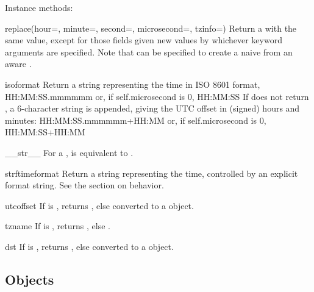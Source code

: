 Instance methods:

\begin{methoddesc}{replace}(hour=, minute=, second=, microsecond=, tzinfo=)
  Return a  with the same value, except for those fields given
  new values by whichever keyword arguments are specified.  Note that
   can be specified to create a naive  from an
  aware .
\end{methoddesc}

\begin{methoddesc}{isoformat}{}
  Return a string representing the time in ISO 8601 format,
      HH:MM:SS.mmmmmm
  or, if self.microsecond is 0,
      HH:MM:SS
  If  does not return , a 6-character
  string is appended, giving the UTC offset in (signed) hours and
  minutes:
      HH:MM:SS.mmmmmm+HH:MM
  or, if self.microsecond is 0,
      HH:MM:SS+HH:MM
\end{methoddesc}

\begin{methoddesc}{__str__}{}
  For a  ,  is equivalent to
  .
\end{methoddesc}

\begin{methoddesc}{strftime}{format}
  Return a string representing the time, controlled by an explicit
  format string.  See the section on  behavior.
\end{methoddesc}

\begin{methoddesc}{utcoffset}{}
  If  is , returns , else
   converted to a 
  object.
\end{methoddesc}

\begin{methoddesc}{tzname}{}
  If  is , returns , else
  .
\end{methoddesc}

\begin{methoddesc}{dst}{}
  If  is , returns , else
   converted to a  object.
\end{methoddesc}



\subsection{  Objects \label{datetime-datetimetz}}

